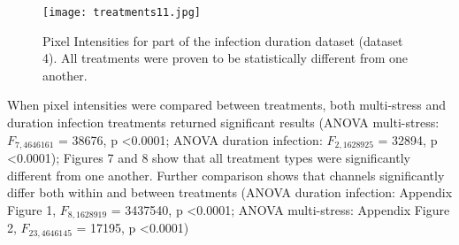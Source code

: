 \documentclass[../../Paper.tex]{subfiles}
\begin{document}
\begin{figure}[!t]
  \centering
  \texttt{[image: treatments11.jpg]}
  \caption{Pixel Intensities for part of the infection duration dataset (dataset 4). All treatments were proven to be statistically different from one another.}
  \label{fig:sub2}
\end{figure}

When pixel intensities were compared between treatments, both multi-stress and duration infection treatments returned significant results (ANOVA multi-stress:  $F_{7,4646161}$ = 38676, p \textless 0.0001; ANOVA duration infection:  $F_{2,1628925}$ = 32894,  p \textless 0.0001); Figures 7 and 8 show that all treatment types were significantly different from one another. Further comparison shows that channels significantly differ both within and between treatments (ANOVA duration infection: Appendix Figure 1, $F_{8,1628919}$ = 3437540,  p \textless 0.0001; ANOVA multi-stress: Appendix Figure 2, $F_{23,4646145}$ = 17195, p \textless 0.0001)
\end{document}
